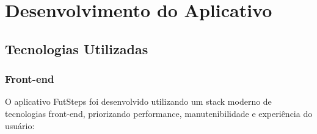 \section{Desenvolvimento do Aplicativo}

\subsection{Tecnologias Utilizadas}

\subsubsection{Front-end}
O aplicativo FutSteps foi desenvolvido utilizando um stack moderno de tecnologias front-end, priorizando performance, manutenibilidade e experiência do usuário:

